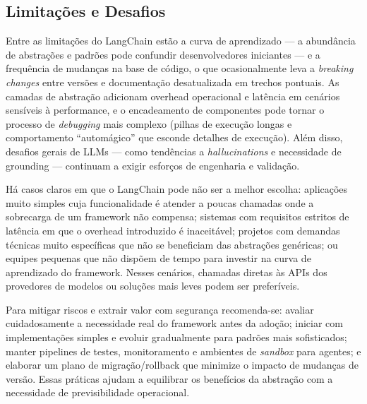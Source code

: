 \documentclass[12pt]{article}
\begin{document}
\subsection{Limitações e Desafios}
\label{subsec:limitacoes}

Entre as limitações do LangChain estão a curva de aprendizado — a abundância de abstrações e padrões pode confundir desenvolvedores iniciantes — e a frequência de mudanças na base de código, o que ocasionalmente leva a \emph{breaking changes} entre versões e documentação desatualizada em trechos pontuais. As camadas de abstração adicionam overhead operacional e latência em cenários sensíveis à performance, e o encadeamento de componentes pode tornar o processo de \textit{debugging} mais complexo (pilhas de execução longas e comportamento “automágico” que esconde detalhes de execução). Além disso, desafios gerais de LLMs — como tendências a \emph{hallucinations} e necessidade de grounding — continuam a exigir esforços de engenharia e validação. \cite{langchain2023github, langchain2023docs, ji2023survey}


Há casos claros em que o LangChain pode não ser a melhor escolha: aplicações muito simples cuja funcionalidade é atender a poucas chamadas onde a sobrecarga de um framework não compensa; sistemas com requisitos estritos de latência em que o overhead introduzido é inaceitável; projetos com demandas técnicas muito específicas que não se beneficiam das abstrações genéricas; ou equipes pequenas que não dispõem de tempo para investir na curva de aprendizado do framework. Nesses cenários, chamadas diretas às APIs dos provedores de modelos ou soluções mais leves podem ser preferíveis. \cite{langchain2023docs}


Para mitigar riscos e extrair valor com segurança recomenda-se: avaliar cuidadosamente a necessidade real do framework antes da adoção; iniciar com implementações simples e evoluir gradualmente para padrões mais sofisticados; manter pipelines de testes, monitoramento e ambientes de \textit{sandbox} para agentes; e elaborar um plano de migração/rollback que minimize o impacto de mudanças de versão. Essas práticas ajudam a equilibrar os benefícios da abstração com a necessidade de previsibilidade operacional. \cite{langchain2023docs, langchain2023github}
\end{document}

